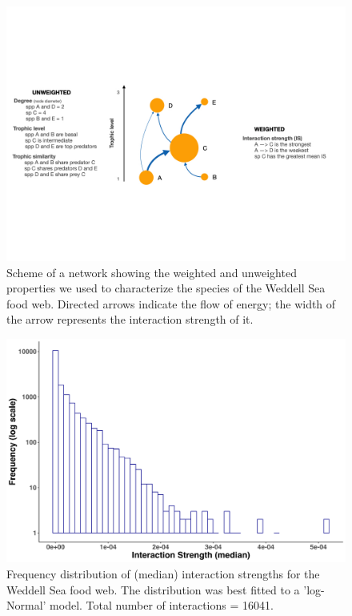 \documentclass[gc, manuscript]{copernicus}
\begin{document}
\begin{figure}
\includegraphics[width=12cm]{Fig.2_ToyFoodWeb} \caption{Scheme of a network showing the weighted and unweighted properties we used to characterize the species of the Weddell Sea food web. Directed arrows indicate the flow of energy; the width of the arrow represents the interaction strength of it.}\label{fig:unnamed-chunk-2}
\end{figure}

\clearpage

\begin{figure}
\includegraphics[width=12cm]{Fig3_IntDist_sim} \caption{Frequency distribution of (median) interaction strengths for the Weddell Sea food web. The distribution was best fitted to a 'log-Normal' model. Total number of interactions = 16041.}\label{fig:unnamed-chunk-3}
\end{figure}

\clearpage
\end{document}
